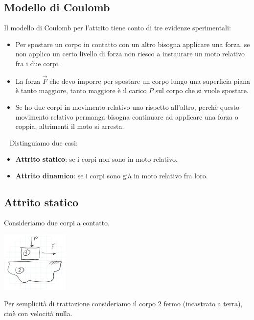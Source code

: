 \subsection{Modello di Coulomb}
Il modello di Coulomb per l'attrito tiene conto di tre evidenze sperimentali:
\begin{itemize}
    \item Per spostare un corpo in contatto con un altro bisogna applicare una forza, se non applico un certo livello di forza non riesco a instaurare un moto relativo fra i due corpi.
    \item La forza $\vec{F}$ che devo imporre per spostare un corpo lungo una superficia piana è tanto maggiore, tanto maggiore è il carico $P$ sul corpo che si vuole spostare.
    \item Se ho due corpi in movimento relativo uno rispetto all'altro, perchè questo movimento relativo permanga bisogna continuare ad applicare una forza o coppia, altrimenti il moto si arresta.
\end{itemize}
\ \newline
Distinguiamo due casi:
\begin{itemize}
    \item \textbf{Attrito statico}: se i corpi non sono in moto relativo.
    \item \textbf{Attrito dinamico}: se i corpi sono già in moto relativo fra loro. 
\end{itemize}
\subsection{Attrito statico}
Consideriamo due corpi a contatto.
\begin{center}
    \includegraphics[height=3cm]{../lezione10/img4.JPG}
\end{center}
Per semplicità di trattazione consideriamo il corpo $2$ fermo (incastrato a terra), cioè con velocità nulla.
